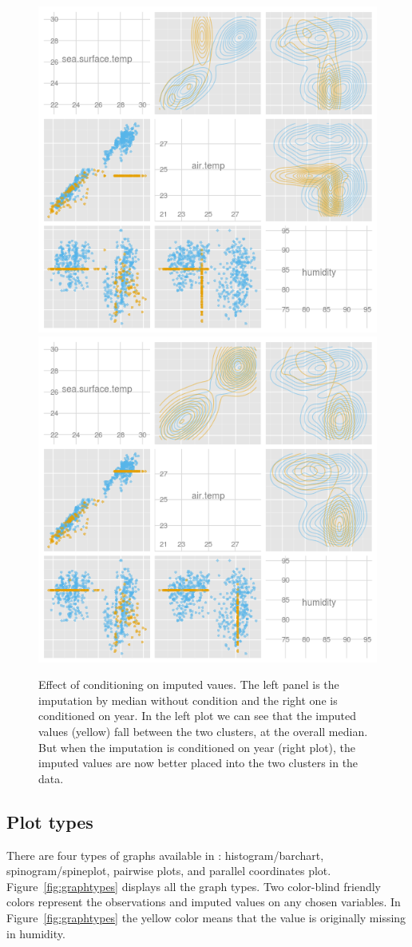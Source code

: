 \documentclass[article]{jss}
\begin{document}
\begin{center}
\begin{figure}[h]
\begin{centering}
\includegraphics[width=.48\textwidth]{graph/fig4-1-median-uncondition}
\includegraphics[width=.48\textwidth]{graph/fig4-2-median-condition}
\par\end{centering}
\caption{Effect of conditioning on imputed vaues. The left panel
is the imputation by median without condition and the right one
is conditioned on year. In the left plot we can see that the
imputed values (yellow) fall between the two clusters, at the
overall median. But when the imputation is conditioned on year
(right plot), the imputed values are now better placed into the
two clusters in the data.}
\label{fig: condition}
\end{figure}
\par\end{center}


\subsection{Plot types}\label{plottype}

There are four types of graphs available in :
histogram/barchart, spinogram/spineplot, pairwise plots, and
parallel coordinates plot. Figure~\ref{fig:graphtypes} displays
all the graph types. Two color-blind friendly colors represent
the observations and imputed values on any chosen variables. In
Figure~\ref{fig:graphtypes} the yellow color means that
the value is originally missing in humidity.
\end{document}
